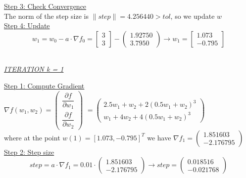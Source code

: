 \underline{Step 3: Check Convergence}\\
The norm of the step size is $\| step \| = 4.256440 > tol$, so we update $w$
\\[4mm]

\underline{Step 4: Update}
\[ 
w_1 = w_0 - a\cdot \nabla f_0 =  \left[\begin{array}{c}
	3 \\
	3
\end{array}\right] - \left(\begin{array}{c}
1.92750 \\
3.7950
\end{array}\right) \rightarrow
w_1 = \left[\begin{array}{c}
	 1.073\\
	 -0.795
\end{array}\right]
\]
\\[4mm]

\begin{center}
	\underline{\textit{ITERATION k = 1}}
\end{center}

\underline{Step 1: Compute Gradient}\\
\(\nabla f(w_1,w_2) = \left(\begin{array}{c}
	\dfrac{\partial f}{\partial w_1} \\[4mm]
	\dfrac{\partial f}{\partial w_2}
\end{array}\right)\) $= \left(\begin{array}{c}
	2.5w_1 + w_2 + 2(0.5w_1+w_2)^3\\[1mm]
	w_1 + 4w_2 + 4(0.5w_1+w_2)^3
\end{array}\right)$ \\[3mm]

where at the point $w\left(1\right) = \left[1.073, -0.795\right]^T$ we have $\nabla f_{1} = \left(\begin{array}{c}
	1.851603 \\
	-2.176795
\end{array}\right)$
\\[4mm]

\underline{Step 2: Step size}
\[
step = a \cdot \nabla f_{1} = 0.01 \cdot \left(\begin{array}{c}
1.851603 \\
-2.176795
\end{array}\right) \rightarrow step =\left(\begin{array}{c}
	0.018516 \\
	-0.021768
\end{array}\right)
\]
\\[4mm]

